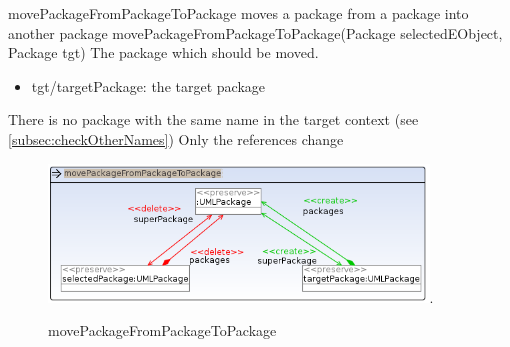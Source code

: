 \op
{movePackageFromPackageToPackage}
{moves a package from a package into another package}
{movePackageFromPackageToPackage(Package selectedEObject, Package tgt)}
{The package which should be moved.}
{
\begin{itemize}
 \item tgt/targetPackage: the target package
\end{itemize}
}
{There is no package with the same name in the target context (see
\ref{subsec:checkOtherNames})}
{Only the references change}
\begin{figure}[H]
  \centering
  \includegraphics[width=0.9\textwidth]{pics/movePackageFromPackageToPackage.png}.
  \caption{movePackageFromPackageToPackage}
  \label{movePackageFromPackageToPackage}
\end{figure}